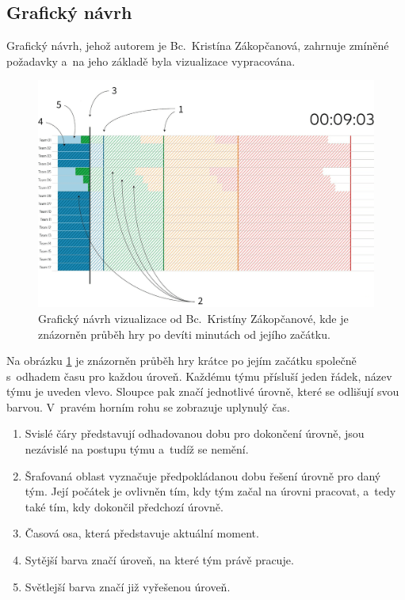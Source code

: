 \documentclass[
  digital, %
  oneside, %
  table,   %
  nolof,     %
  nolot,     %
  nocover
]{fithesis3}
\begin{document}
\subsection{Grafický návrh}
Grafický návrh, jehož autorem je Bc.~Kristína Zákopčanová, zahrnuje zmíněné požadavky a~na jeho základě byla vizualizace vypracována.\par
\begin{figure}[h]
  \begin{center}
    \includegraphics[width=12.7cm]{images/navrh-vizualizace-1-4.png}
  \end{center}
  \caption{Grafický návrh vizualizace od Bc.~Kristíny Zákopčanové, kde je znázorněn průběh hry po devíti minutách od jejího začátku.}
  \label{fig:progress1}
\end{figure}
Na obrázku \ref{fig:progress1} je znázorněn průběh hry krátce po jejím začátku společně s~odhadem času pro každou úroveň. Každému týmu přísluší jeden řádek, název týmu je uveden vlevo. Sloupce pak značí jednotlivé úrovně, které se odlišují svou barvou. V~pravém horním rohu se zobrazuje uplynulý čas.
\begin{enumerate}
  \item Svislé čáry představují odhadovanou dobu pro dokončení úrovně, jsou nezávislé na postupu týmu a~tudíž se nemění.
  \item Šrafovaná oblast vyznačuje předpokládanou dobu řešení úrovně pro daný tým. Její počátek je ovlivněn tím, kdy tým začal na úrovni pracovat, a~tedy také tím, kdy dokončil předchozí úrovně.
  \item Časová osa, která představuje aktuální moment.
  \item Sytější barva značí úroveň, na které tým právě pracuje.
  \item Světlejší barva značí již vyřešenou úroveň.
\end{enumerate}
\end{document}
